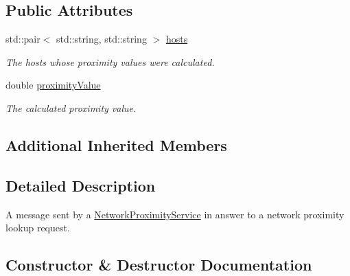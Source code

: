 \subsection*{Public Attributes}
\begin{DoxyCompactItemize}
\item 
\mbox{\label{classwrench_1_1_network_proximity_lookup_answer_message_a7a2f74767626046b35cc52a16ec97405}} 
std\+::pair$<$ std\+::string, std\+::string $>$ \hyperlink{classwrench_1_1_network_proximity_lookup_answer_message_a7a2f74767626046b35cc52a16ec97405}{hosts}
\begin{DoxyCompactList}\small\item\em The hosts whose proximity values were calculated. \end{DoxyCompactList}\item 
\mbox{\label{classwrench_1_1_network_proximity_lookup_answer_message_abd1f3b09f1ba1141d9f55588edb2606c}} 
double \hyperlink{classwrench_1_1_network_proximity_lookup_answer_message_abd1f3b09f1ba1141d9f55588edb2606c}{proximity\+Value}
\begin{DoxyCompactList}\small\item\em The calculated proximity value. \end{DoxyCompactList}\end{DoxyCompactItemize}
\subsection*{Additional Inherited Members}


\subsection{Detailed Description}
A message sent by a \hyperlink{classwrench_1_1_network_proximity_service}{Network\+Proximity\+Service} in answer to a network proximity lookup request. 

\subsection{Constructor \& Destructor Documentation}
\mbox{\label{classwrench_1_1_network_proximity_lookup_answer_message_aff3f4b8a1c8675a9d42e0e5be7d287f1}} 
